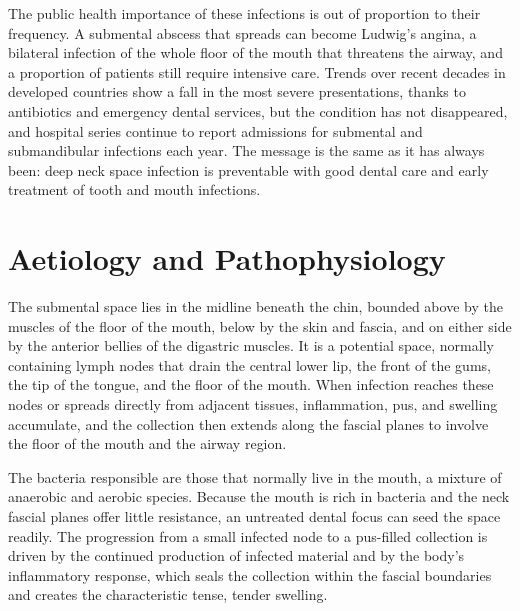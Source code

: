 The public health importance of these infections is out of proportion to their frequency. A submental abscess that spreads can become Ludwig's angina, a bilateral infection of the whole floor of the mouth that threatens the airway, and a proportion of patients still require intensive care. Trends over recent decades in developed countries show a fall in the most severe presentations, thanks to antibiotics and emergency dental services, but the condition has not disappeared, and hospital series continue to report admissions for submental and submandibular infections each year. The message is the same as it has always been: deep neck space infection is preventable with good dental care and early treatment of tooth and mouth infections.

\section*{Aetiology and Pathophysiology}
The submental space lies in the midline beneath the chin, bounded above by the muscles of the floor of the mouth, below by the skin and fascia, and on either side by the anterior bellies of the digastric muscles. It is a potential space, normally containing lymph nodes that drain the central lower lip, the front of the gums, the tip of the tongue, and the floor of the mouth. When infection reaches these nodes or spreads directly from adjacent tissues, inflammation, pus, and swelling accumulate, and the collection then extends along the fascial planes to involve the floor of the mouth and the airway region.

The bacteria responsible are those that normally live in the mouth, a mixture of anaerobic and aerobic species. Because the mouth is rich in bacteria and the neck fascial planes offer little resistance, an untreated dental focus can seed the space readily. The progression from a small infected node to a pus-filled collection is driven by the continued production of infected material and by the body's inflammatory response, which seals the collection within the fascial boundaries and creates the characteristic tense, tender swelling.

